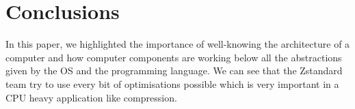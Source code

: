 \documentclass{sig-alternate-05-2015}
\begin{document}
\section{Conclusions}
    In this paper, we highlighted the importance of well-knowing the architecture of a computer and
    how computer components are working below all the abstractions given by the OS and the
    programming language. We can see that the Zstandard team try to use every bit of optimisations
    possible which is very important in a CPU heavy application like compression.

\newpage

\end{document}
